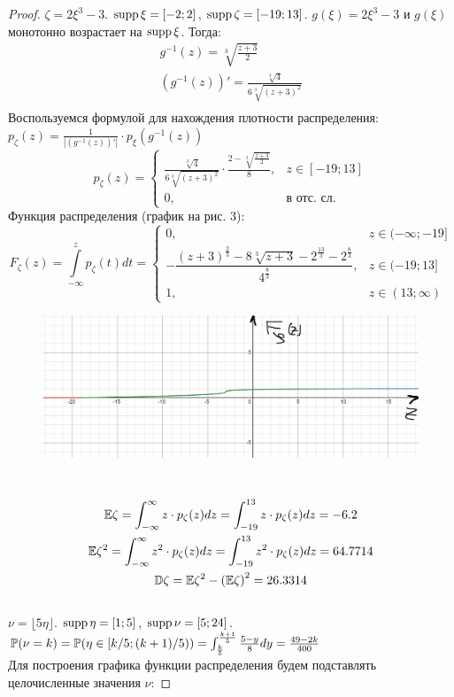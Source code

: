 \begin{proof}
$\zeta = 2\xi^3 - 3$. $\operatorname{\mathop{supp}}\xi = [-2;2]$, $\operatorname{\mathop{supp}}\zeta = [-19;13]$. $g(\xi) = 2\xi^3 - 3$ и $g(\xi)$ монотонно возрастает на $\operatorname{\mathop{supp}}\xi$. Тогда:
\begin{gather*}
g^{-1}(z) = \sqrt[3]{\frac{z + 3}{2}}\\
(g^{-1}(z))' = \frac{\sqrt[3]{4}}{6\sqrt[3]{(z + 3)^2}}\\
\end{gather*}
Воспользуемся формулой для нахождения плотности распределения:\\
$p_{\zeta}(z) = \frac{1}{|(g^{-1}(z))'|} \cdot p_\xi(g^{-1}(z))$\\
\[
p_{\zeta}(z) = \begin{cases}
    \frac{\sqrt[3]{4}}{6\sqrt[3]{(z + 3)^2}}\cdot \frac{2 - \sqrt[3]{\frac{z+3}{2}}}{8}, & z \in [-19;13]\\
    0, & \text{в отс. сл.}
    \end{cases}
\]
Функция распределения (график на рис. 3):
\[
F_{\zeta}(z) = \int\limits_{-\infty}^{z}p_{\zeta}(t)dt = \begin{cases}
    0, & z\in (-\infty;-19]\\
    -\dfrac{\left(z+3\right)^\frac{2}{3}-8\sqrt[3]{z+3}-2^\frac{13}{3}-2^\frac{8}{3}}{4^\frac{8}{3}}, & z\in (-19; 13]\\
    1, & z\in (13;\infty)
\end{cases}
\]

\begin{figure}[H]
    \centering
    \includegraphics[width=0.5\linewidth]{3idz_3.png}
    \caption{}
    \label{fig:enter-label}
\end{figure}
\\
\begin{gather*}
    \mathbb E\zeta = \int_{-\infty}^{\infty}z\cdot p_{\zeta}(z)dz = \int_{-19}^{13}z\cdot p_{\zeta}(z)dz = -6.2\\
    \mathbb E\zeta^2 = \int_{-\infty}^{\infty}z^2\cdot p_{\zeta}(z)dz = \int_{-19}^{13}z^2\cdot p_{\zeta}(z)dz = 64.7714\\
    \mathbb D\zeta = \mathbb E\zeta^2 - \left(\mathbb E\zeta\right)^2 = 26.3314
\end{gather*}
\\
$\nu = \lfloor5\eta\rfloor$. $\operatorname{\mathop{supp}}\eta = [1;5]$, $\operatorname{\mathop{supp}}\nu = [5;24]$.
$
\mathbb P(\nu = k) = \mathbb P(\eta\in[k/5; (k + 1)/5)) = \int_{\frac{k}{5}}^{\frac{k + 1}{5}}\frac{5-y}{8}dy = \frac{49-2k}{400}
$\\
Для построения графика функции распределения будем подставлять целочисленные значения $\nu$:


\end{proof}
